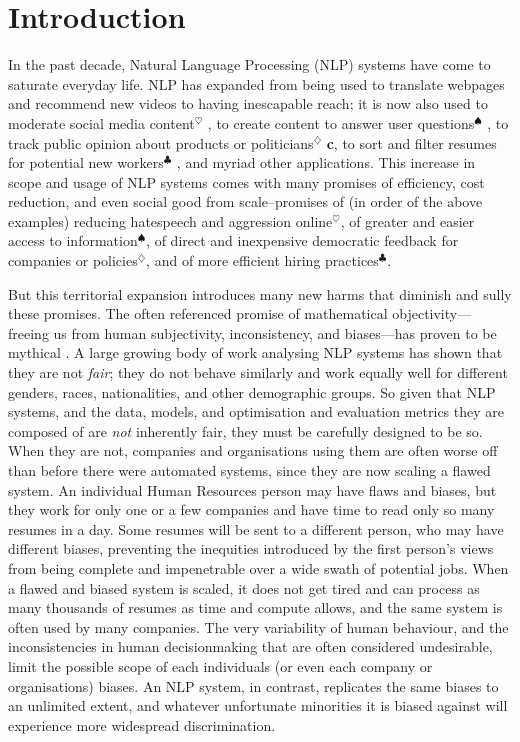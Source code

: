 \chapter{Introduction} \label{chapter:introduction}
In the past decade, Natural Language Processing (NLP) systems have come to saturate everyday life. NLP has expanded from being used to translate webpages and recommend new videos to having inescapable reach; it is now also used to moderate social media content$^{\heartsuit}$ \citep{}, to create content to answer user questions$^{\spadesuit}$ \citep{}, to track public opinion about products or politicians$^{\diamondsuit}$ \citep{} \textbf{c}, to sort and filter resumes for potential new workers$^{\clubsuit}$ \cite{}, and myriad other applications.
This increase in scope and usage of NLP systems comes with many promises of efficiency, cost reduction, and even social good from scale--promises of (in order of the above examples) reducing hatespeech and aggression online$^{\heartsuit}$, of greater and easier access to information$^{\spadesuit}$, of direct and inexpensive democratic feedback for companies or policies$^{\diamondsuit}$, and of more efficient hiring practices$^{\clubsuit}$.

But this territorial expansion introduces many new harms that diminish and sully these promises.  
The often referenced promise of mathematical objectivity---freeing us from human subjectivity, inconsistency, and biases---has proven to be mythical \citep{oneil2016weapons}. A large growing body of work analysing NLP systems has shown that they are not \textit{fair}; they do not behave similarly and work equally well for different genders, races, nationalities, and other demographic groups. So given that NLP systems, and the data, models, and optimisation and evaluation metrics they are composed of are \textit{not} inherently fair, they must be carefully designed to be so. When they are not, companies and organisations using them are often worse off than before there were automated systems, since they are now scaling a flawed system. An individual Human Resources person may have flaws and biases, but they work for only one or a few companies and have time to read only so many resumes in a day. Some resumes will be sent to a different person, who may have different biases, preventing the inequities introduced by the first person's views from being complete and impenetrable over a wide swath of potential jobs. When a flawed and biased system is scaled, it does not get tired and can process as many thousands of resumes as time and compute allows, and the same system is often used by many companies. The very variability of human behaviour, and the inconsistencies in human decisionmaking that are often considered undesirable, limit the possible scope of each individuals (or even each company or organisations) biases. An NLP system, in contrast, replicates the same biases to an unlimited extent, and whatever unfortunate minorities it is biased against will experience more widespread discrimination.

